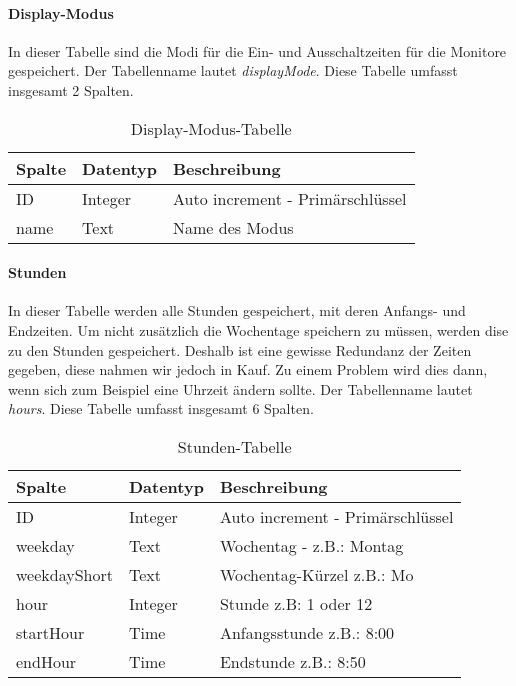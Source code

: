 \paragraph{Display-Modus\\}
In dieser Tabelle sind die Modi für die Ein- und Ausschaltzeiten für die Monitore gespeichert. Der Tabellenname lautet \textit{displayMode}. Diese Tabelle umfasst insgesamt 2 Spalten.
\begin{table}[H]
\centering
\begin{tabular}{p{2.5 cm}p{2.5 cm}p{10 cm}}
   \toprule
   \textbf{Spalte} & \textbf{Datentyp} & \textbf{Beschreibung} \\
   \midrule
          ID & Integer & Auto increment - Primärschlüssel  \\
          \hline
          name & Text & Name des Modus \\
   \bottomrule
\end{tabular}
\caption{Display-Modus-Tabelle}
\end{table}

\paragraph{Stunden\\}
In dieser Tabelle werden alle Stunden gespeichert, mit deren Anfangs- und Endzeiten. Um nicht zusätzlich die Wochentage speichern zu müssen, werden dise zu den Stunden gespeichert. Deshalb ist eine gewisse Redundanz der Zeiten gegeben, diese nahmen wir jedoch in Kauf. Zu einem Problem wird dies dann, wenn sich zum Beispiel eine Uhrzeit ändern sollte. Der Tabellenname lautet \textit{hours}. Diese Tabelle umfasst insgesamt 6 Spalten.
\begin{table}[H]
\centering
\begin{tabular}{p{2.5 cm}p{2.5 cm}p{10 cm}}
   \toprule
   \textbf{Spalte} & \textbf{Datentyp} & \textbf{Beschreibung} \\
   \midrule
          ID & Integer & Auto increment - Primärschlüssel  \\
          \hline
          weekday & Text & Wochentag - z.B.: Montag  \\
          \hline
          weekdayShort & Text & Wochentag-Kürzel z.B.: Mo   \\
          \hline
          hour & Integer & Stunde z.B: 1 oder 12  \\
          \hline
          startHour & Time & Anfangsstunde z.B.: 8:00  \\
          \hline
          endHour & Time & Endstunde z.B.: 8:50 \\
   \bottomrule
\end{tabular}
\caption{Stunden-Tabelle}
\end{table}

